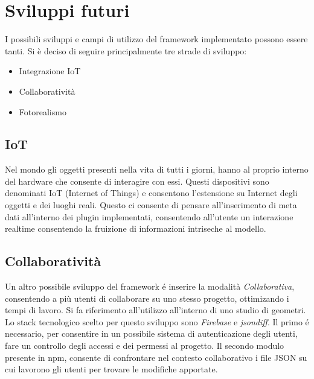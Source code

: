 \section{Sviluppi futuri}
\label{sec:conclusions_section_2}

I possibili sviluppi e campi di utilizzo del framework implementato possono essere tanti.
Si \`e deciso di seguire principalmente tre strade di sviluppo:
\begin{itemize}
\item Integrazione IoT
\item Collaboratività
\item Fotorealismo
\end{itemize}
\newpage

\subsection{IoT}
\label{sec:conclusions_section_2_sub_1}
Nel mondo gli oggetti presenti nella vita di tutti i giorni, hanno al proprio interno del hardware che consente di interagire
con essi. Questi dispositivi sono denominati IoT (Internet of Things) e consentono l'estensione su Internet degli oggetti e dei
luoghi reali. Questo ci consente di pensare all'inserimento di meta dati all'interno dei plugin implementati,
consentendo all'utente un interazione realtime consentendo la fruizione di informazioni
intriseche al modello.

\newpage

\subsection{Collaboratività}
\label{sec:conclusions_section_2_sub_2}
Un altro possibile sviluppo del framework \'e inserire la modalità \emph{Collaborativa}, consentendo a più utenti
di collaborare su uno stesso progetto, ottimizando i tempi di lavoro. Si fa riferimento
all'utilizzo all'interno di uno studio di geometri. Lo stack tecnologico scelto per questo sviluppo sono
\emph{Firebase} e \emph{jsondiff}. Il primo \'e necessario, per consentire in un possibile sistema di autenticazione degli utenti,
fare un controllo degli accessi e dei permessi al progetto.
Il secondo modulo presente in npm, consente di confrontare nel contesto collaborativo i file JSON su cui lavorono
gli utenti per trovare le modifiche apportate.


\newpage

